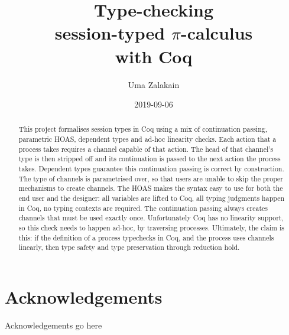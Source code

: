 \documentclass{mproj}
\newcommand{\picalc}{$\pi$-calculus}
\begin{document}
\title{Type-checking\\ session-typed \picalc \\ with Coq}
\author{Uma Zalakain}
\date{2019-09-06}
\maketitle

\begin{abstract}
    This project formalises session types in Coq using a mix of continuation passing, parametric HOAS, dependent types and ad-hoc linearity checks. Each action that a process takes requires a channel capable of that action. The head of that channel's type is then stripped off and its continuation is passed to the next action the process takes. Dependent types guarantee this continuation passing is correct by construction. The type of channels is parametrised over, so that users are unable to skip the proper mechanisms to create channels. The HOAS makes the syntax easy to use for both the end user and the designer: all variables are lifted to Coq, all typing judgments happen in Coq, no typing contexts are required. The continuation passing always creates channels that must be used exactly once.  Unfortunately Coq has no linearity support, so this check needs to happen ad-hoc, by traversing processes. Ultimately, the claim is this: if the definition of a process typechecks in Coq, and the process uses channels linearly, then type safety and type preservation through reduction hold.
\end{abstract}

\educationalconsent
\vfill{}
\doclicenseThis
\newpage

\section*{Acknowledgements}

Acknowledgements go here

\tableofcontents
\end{document}

